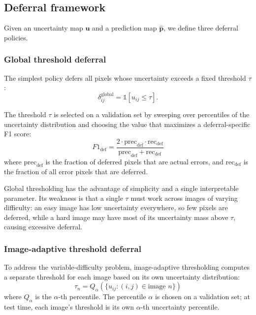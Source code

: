 \subsection{Deferral framework}
\label{sec:deferral}

Given an uncertainty map $\mathbf{u}$ and a prediction map $\hat{\mathbf{p}}$,
we define three deferral policies.

\subsubsection{Global threshold deferral}

The simplest policy defers all pixels whose uncertainty exceeds a fixed
threshold $\tau$:
\begin{equation}
  \delta_{ij}^{\text{global}} = \mathbb{1}[u_{ij} \leq \tau].
  \label{eq:global}
\end{equation}

The threshold $\tau$ is selected on a validation set by sweeping over
percentiles of the uncertainty distribution and choosing the value that
maximizes a deferral-specific F1 score:
\begin{equation}
  F1_{\text{def}} = \frac{2 \cdot \text{prec}_{\text{def}} \cdot
  \text{rec}_{\text{def}}}{\text{prec}_{\text{def}} +
  \text{rec}_{\text{def}}}
  \label{eq:def_f1}
\end{equation}
where $\text{prec}_{\text{def}}$ is the fraction of deferred pixels that are
actual errors, and $\text{rec}_{\text{def}}$ is the fraction of all error
pixels that are deferred.

Global thresholding has the advantage of simplicity and a single
interpretable parameter. Its weakness is that a single $\tau$ must work
across images of varying difficulty: an easy image has low uncertainty
everywhere, so few pixels are deferred, while a hard image may have most
of its uncertainty mass above $\tau$, causing excessive deferral.

\subsubsection{Image-adaptive threshold deferral}

To address the variable-difficulty problem, image-adaptive thresholding
computes a separate threshold for each image based on its own uncertainty
distribution:
\begin{equation}
  \tau_n = Q_\alpha(\{u_{ij} : (i,j) \in \text{image } n\})
  \label{eq:adaptive_threshold}
\end{equation}
where $Q_\alpha$ is the $\alpha$-th percentile. The percentile $\alpha$
is chosen on a validation set; at test time, each image's threshold is
its own $\alpha$-th uncertainty percentile.

